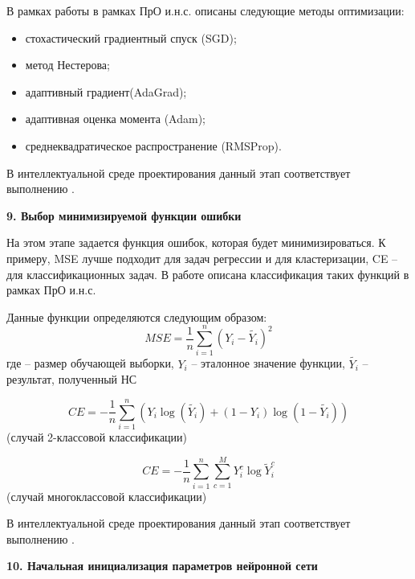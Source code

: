В рамках работы  в рамках ПрО и.н.с. описаны следующие методы оптимизации:
\begin{itemize}
	\item стохастический градиентный спуск (SGD);
	\item метод Нестерова;
	\item адаптивный градиент(AdaGrad);
	\item адаптивная оценка момента (Adam);
	\item среднеквадратическое распространение (RMSProp).
\end{itemize}

В интеллектуальной среде проектирования данный этап соответствует выполнению .


\textbf{9. Выбор минимизируемой функции ошибки}

На этом этапе задается функция ошибок, которая будет минимизироваться. К примеру, MSE лучше подходит для задач регрессии и для кластеризации, CE -- для классификационных задач.
В работе  описана классификация таких функций в рамках ПрО и.н.с.

Данные функции определяются следующим образом:
\begin{equation*}
	MSE = \frac{1}{n} \sum_{i=1}^n (Y_i - \widetilde{Y_i})^2
\end{equation*}
где  -- размер обучающей выборки, $Y_i$ -- эталонное значение функции, $\widetilde{Y_i}$ -- результат, полученный НС

\begin{equation*}
	CE = - \frac{1}{n} \sum_{i=1}^n (Y_i\log(\widetilde{Y_i}) + (1-Y_i)\log(1 - \widetilde{Y_i}))
\end{equation*}
(случай 2-классовой классификации)

\begin{equation*}
	CE = - \frac{1}{n} \sum_{i=1}^n \sum_{c=1}^M Y_i^c \log{\widetilde{Y}_i^c}
\end{equation*}
(случай многоклассовой классификации)

В интеллектуальной среде проектирования данный этап соответствует выполнению .


\textbf{10. Начальная инициализация параметров нейронной сети}

